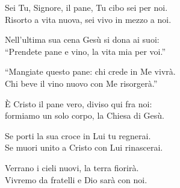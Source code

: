 
\strofa Sei Tu, Signore, il pane, Tu cibo sei per noi.\\
Risorto a vita nuova, sei vivo in mezzo a noi.

\spazio

\strofa Nell'ultima sua cena Gesù si dona ai suoi:\\
``Prendete pane e vino, la vita mia per voi.''

\spazio

\strofa ``Mangiate questo pane: chi crede in Me vivrà.\\
Chi beve il vino nuovo con Me risorgerà.''

\spazio

\strofa È Cristo il pane vero, diviso qui fra noi:\\
formiamo un solo corpo, la Chiesa di Gesù.

\spazio

\strofa Se porti la sua croce in Lui tu regnerai.\\
Se muori unito a Cristo con Lui rinascerai.

\spazio

\strofa Verrano i cieli nuovi, la terra fiorirà.\\
Vivremo da fratelli e Dio sarà con noi.
